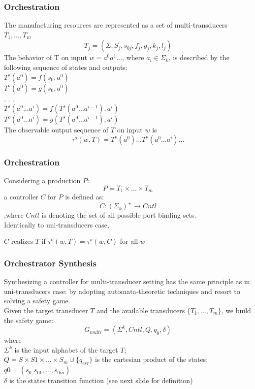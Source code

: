 \documentclass{beamer}
\theoremstyle{definition}
\theoremstyle{plain}
\begin{document}
\begin{frame}
\frametitle{Orchestration}
The manufacturing resources are represented as a set of multi-transducers $T_{1}, . . . , T_{m}$\\
$$T_{j} = (\Sigma, S_{j}, s_{0j}, f_{j}, g_{j}, k_{j}, l_{j})$$
The behavior of T on input $w = a^{0}a^{1}. . . $, where $a_{i} \in \Sigma_{k}$, is described by the following sequence of states and outputs:\\
$T^{s}(a^{0}) = f(s_{0}, a^{0})$\\
$T^{o}(a^{0}) = g(s_{0}, a^{0})$\\
. . .\\
$T^{s}(a^{0} . . . a^{i}) = f(T^{s}(a^{0} . . . a^{i-1}), a^{i})$\\
$T^{o}(a^{0} . . . a^{i}) = g(T^{s}(a^{0} . . . a^{i-1}), a^{i})$\\
The observable output sequence of $T$ on input $w$ is
$$\tau^{o}(w, T) = T^{o}(a^{0}) . . . T^{o}(a^{0} . . . a^{i}) . . .$$
\end{frame}

\begin{frame}
\frametitle{Orchestration}
Considering a production $P$:
$$P = T_{1} \times . . . \times T_{m}$$
a controller $C$ for $P$ is defined as:
$$C : (\Sigma_{k})^{+} \to Cntl$$
,where $Cntl$ is denoting the set of all possible port binding sets.
\\
Identically to uni-transducers case,
\begin{theorem}
$C$ realizes $T$ if $\tau^{o}(w, T) = \tau^{o}(w, C)$ for all $w$
\end{theorem}
\end{frame}

\begin{frame}
\frametitle{Orchestrator Synthesis}
Synthesizing a controller for multi-transducer setting has the same principle as in uni-transducers case:  by adopting automata-theoretic techniques and resort to solving a safety game.\\
Given the target transducer $T$ and the available transducers $\{T_{1}, . . . ,T_{m}\}$, we build the safety
game:
$$G_{multi} = (\Sigma^{k}, Cntl, Q, q_{0}, \delta)$$
where\\
$\Sigma^{k}$ is the input alphabet of the target $T$;\\
$Q = S \times S1\times . . . \times S_{m} \cup \{q_{err}\}$ is the cartesian product of the states;\\
$q0 = (s_{0,} s_{01}, . . . , s_{0m})$\\
$\delta$ is the states transition function (see next slide for definition)
\end{frame}
\end{document}
